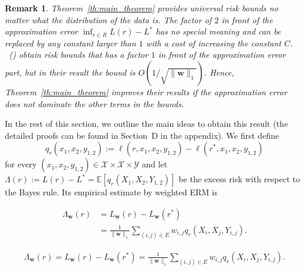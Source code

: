 \documentclass[letterpaper]{article} %
\def\DoubleColumn{}
\def\DoubleColumnEnd{}
\def\SingleColumn{}
\def\SingleColumnEnd{}
\newtheorem{remark}{Remark}
\newtheorem*{remark*}{Remark}
\newcommand{\E}{\mathbb{E}}
\newcommand{\weight}{\mathbf{w}}
\newcommand{\yspace}{\mathcal{Y}}
\newcommand{\bayeserror}{L^*}
\newcommand{\empiricalrisk}[1]{L_{#1}}
\newcommand{\risk}{L}
\newcommand{\lossf}{\ell}
\newcommand{\pair}[1]{(#1)}
\newcommand{\normo}[1]{\|#1\|_1}
\newcommand{\citet}[1]{\citeauthor{#1}\ (\citeyear{#1})}
\begin{document}
\begin{remark*}
Theorem~\ref{th:main_theorem} provides universal risk bounds no matter what the distribution of the data is. The factor of $2$ in front of the approximation error $\inf_{r\in R}\risk(r)-\bayeserror$ has no special meaning and can be replaced by any constant larger than $1$ with a cost of increasing the constant $C$. 
\citet{wang2017learning} obtain risk bounds that has a factor $1$ in front of the approximation error part, but in their result the bound is $O(1/\sqrt{\normo{\weight{}}})$. 
Hence, Theorem~\ref{th:main_theorem} improves their results if the approximation error does not dominate the other terms in the bounds.
\end{remark*}


In the rest of this section, we outline the main ideas to obtain this result (the detailed proofs can be found in Section~D in the 
appendix).
We first define
\[q_r(x_1,x_2,y_{1,2}):=\lossf(r, x_1,x_2,y_{1,2})-\lossf(r^*,x_1,x_2,y_{1,2})\]
for every $(x_1,x_2,y_{1,2})\in \mathcal X\times\mathcal X\times\yspace{}$ and let $\Lambda(r) := \risk(r)-\bayeserror=\E[q_r(X_1,X_2,Y_{1,2})]$
be the excess risk with respect to the Bayes rule.
Its empirical estimate by weighted ERM is 
\DoubleColumn
\begin{align*}
    \Lambda_\weight{}(r) &= \empiricalrisk{\weight{}}(r)-\empiricalrisk{\weight{}}(r^*)\\
    &=\frac{1}{\normo{\weight{}}}\sum_{\pair{i,j}\in E} w_{i,j} q_r(X_i,X_j,Y_{i,j}).
\end{align*}
\DoubleColumnEnd
\SingleColumn
\begin{align*}
    \Lambda_\weight{}(r) = \empiricalrisk{\weight{}}(r)-\empiricalrisk{\weight{}}(r^*)=\frac{1}{\normo{\weight{}}}\sum_{\pair{i,j}\in E} w_{i,j} q_r(X_i,X_j,Y_{i,j}).
\end{align*}
\SingleColumnEnd
\end{document}
